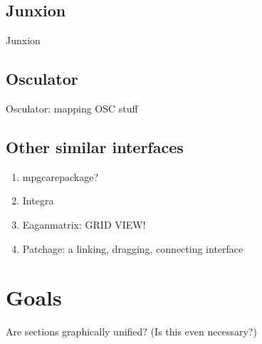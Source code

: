 	\subsection{Junxion}
		Junxion 
	\subsection{Osculator}
		Osculator: mapping OSC stuff 
	\subsection{Other similar interfaces}
		\begin{enumerate}
		\item mpgcarepackage?
		\item Integra 
		\item Eaganmatrix: GRID VIEW! 
		\item Patchage: a linking, dragging, connecting interface 
		\end{enumerate}

\section{Goals}
	Are sections graphically unified? (Is this even necessary?)




